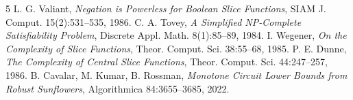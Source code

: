 \documentclass[11pt]{article}
\begin{document}
\begin{thebibliography}{5}
 L. G. Valiant, \emph{Negation is Powerless for Boolean Slice Functions}, SIAM J. Comput. 15(2):531--535, 1986.
 C. A. Tovey, \emph{A Simplified NP-Complete Satisfiability Problem}, Discrete Appl. Math. 8(1):85--89, 1984.
 I. Wegener, \emph{On the Complexity of Slice Functions}, Theor. Comput. Sci. 38:55--68, 1985.
 P. E. Dunne, \emph{The Complexity of Central Slice Functions}, Theor. Comput. Sci. 44:247--257, 1986.
 B. Cavalar, M. Kumar, B. Rossman, \emph{Monotone Circuit Lower Bounds from Robust Sunflowers}, Algorithmica 84:3655--3685, 2022.
\end{thebibliography}
\end{document}
